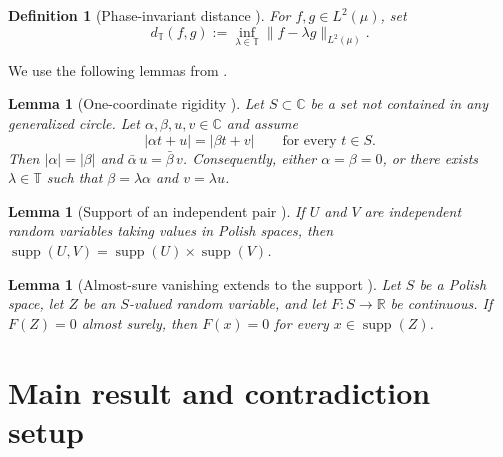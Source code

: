 \documentclass[11pt]{amsart}
\newtheorem{lemma}[theorem]{Lemma}
\newtheorem{definition}[theorem]{Definition}
\newcommand{\C}{\mathbb{C}}
\newcommand{\R}{\mathbb{R}}
\newcommand{\T}{\mathbb{T}}
\newcommand{\supp}{\operatorname{supp}}
\newcommand{\dT}{d_{\mathbb{T}}}
\begin{document}
\begin{definition}[Phase-invariant distance {\cite[Definition~2.2]{complex_spr}}]
For $f,g \in L^2(\mu)$, set
\[
  \dT(f,g) := \inf_{\lambda \in \T} \|f-\lambda g\|_{L^2(\mu)}.
\]
\end{definition}

We use the following lemmas from \cite{complex_spr}.

\begin{lemma}[One-coordinate rigidity {\cite[Lemma~3.10]{complex_spr}}]
\label{lem:one-coord}
Let $S \subset \C$ be a set not contained in any generalized circle.  Let
$\alpha,\beta,u,v \in \C$ and assume
\[
  |\alpha t + u| = |\beta t + v| \qquad \text{for every } t \in S.
\]
Then $|\alpha|=|\beta|$ and $\bar\alpha\,u=\bar\beta\,v$.  Consequently, either
$\alpha=\beta=0$, or there exists $\lambda \in \T$ such that
$\beta=\lambda\alpha$ and $v=\lambda u$.
\end{lemma}

\begin{lemma}[Support of an independent pair {\cite[Lemma~3.11]{complex_spr}}]
\label{lem:supp-prod}
If $U$ and $V$ are independent random variables taking values in Polish spaces,
then $\supp(U,V)=\supp(U)\times \supp(V)$.
\end{lemma}

\begin{lemma}[Almost-sure vanishing extends to the support
  {\cite[Lemma~3.12]{complex_spr}}]
\label{lem:as-support}
Let $S$ be a Polish space, let $Z$ be an $S$-valued random variable, and let
$F:S\to\R$ be continuous.  If $F(Z)=0$ almost surely, then
$F(x)=0$ for every $x\in\supp(Z)$.
\end{lemma}

\section{Main result and contradiction setup}
\label{sec:main}
\end{document}
